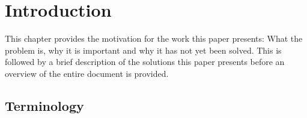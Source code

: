 \documentclass[a4paper,12pt,twoside,openright]{report}
\begin{document}
\pagestyle{empty}
\singlespacing

\onehalfspacing

\singlespacing


\setcounter{page}{0}
\pagestyle{plain}
\tableofcontents

\onehalfspacing


\chapter{Introduction}
\setcounter{page}{1}

This chapter provides the motivation for the work this paper presents: What the
problem is, why it is important and why it has not yet been solved. This is
followed by a brief description of the solutions this paper presents before an
overview of the entire document is provided.

\section{Terminology}
\end{document}
